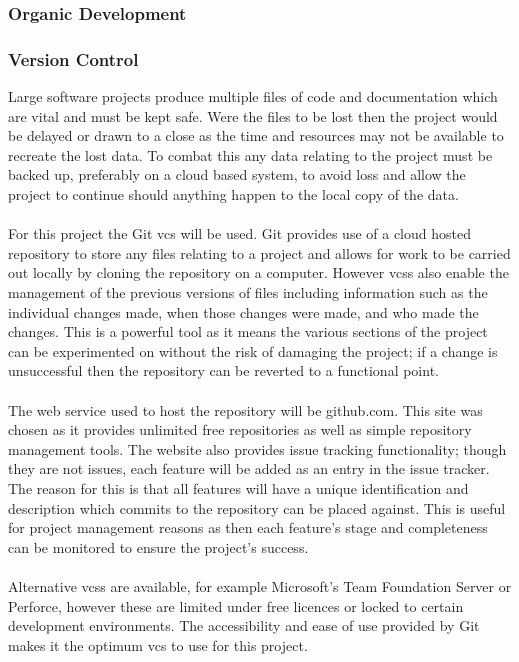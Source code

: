 	\subsubsection{Organic Development}
		
	\subsubsection{Version Control}
		Large software projects produce multiple files of code and documentation which are vital and must be kept safe. Were the files to be lost then the project would be delayed or drawn to a close as the time and resources may not be available to recreate the lost data. To combat this any data relating to the project must be backed up, preferably on a cloud based system, to avoid loss and allow the project to continue should anything happen to the local copy of the data.
		\\\\
		For this project the Git \gls{vcs} will be used. Git provides use of a cloud hosted repository to store any files relating to a project and allows for work to be carried out locally by cloning the repository on a computer. However \glspl{vcs} also enable the management of the previous versions of files including information such as the individual changes made, when those changes were made, and who made the changes. This is a powerful tool as it means the various sections of the project can be experimented on without the risk of damaging the project; if a change is unsuccessful then the repository can be reverted to a functional point.
		\\\\
		The web service used to host the repository will be github.com. This site was chosen as it provides unlimited free repositories as well as simple repository management tools. The website also provides issue tracking functionality; though they are not issues, each feature will be added as an entry in the issue tracker. The reason for this is that all features will have a unique identification and description which commits to the repository can be placed against. This is useful for project management reasons as then each feature's stage and completeness can be monitored to ensure the project's success.
		\\\\
		Alternative \glspl{vcs} are available, for example Microsoft's Team Foundation Server or Perforce, however these are limited under free licences or locked to certain development environments. The accessibility and ease of use provided by Git makes it the optimum \gls{vcs} to use for this project. 
